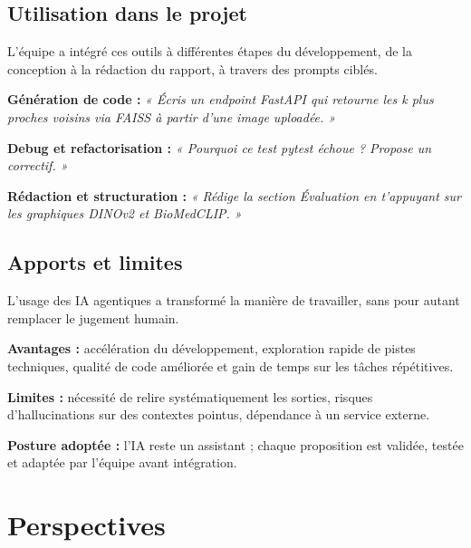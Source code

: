 \documentclass[12pt,a4paper]{article}
\newcommand{\NewMajorPart}{\clearpage}
\begin{document}
\vspace{0.15cm}

\subsection{Utilisation dans le projet}

L'équipe a intégré ces outils à différentes étapes du développement, de la conception
à la rédaction du rapport, à travers des prompts ciblés.
\begin{sq}
  \item \textbf{Génération de code :} \textit{« Écris un endpoint FastAPI qui retourne les k plus proches voisins via FAISS à partir d'une image uploadée. »}
  \item \textbf{Debug et refactorisation :} \textit{« Pourquoi ce test pytest échoue ? Propose un correctif. »}
  \item \textbf{Rédaction et structuration :} \textit{« Rédige la section Évaluation en t'appuyant sur les graphiques DINOv2 et BioMedCLIP. »}
\end{sq}

\vspace{0.15cm}

\subsection{Apports et limites}

L'usage des IA agentiques a transformé la manière de travailler, sans pour autant
remplacer le jugement humain.
\begin{sq}
  \item \textbf{Avantages :} accélération du développement, exploration rapide de pistes techniques, qualité de code améliorée et gain de temps sur les tâches répétitives.
  \item \textbf{Limites :} nécessité de relire systématiquement les sorties, risques d'hallucinations sur des contextes pointus, dépendance à un service externe.
  \item \textbf{Posture adoptée :} l'IA reste un assistant ; chaque proposition est validée, testée et adaptée par l'équipe avant intégration.
\end{sq}

\NewMajorPart
\section{Perspectives}
\end{document}
